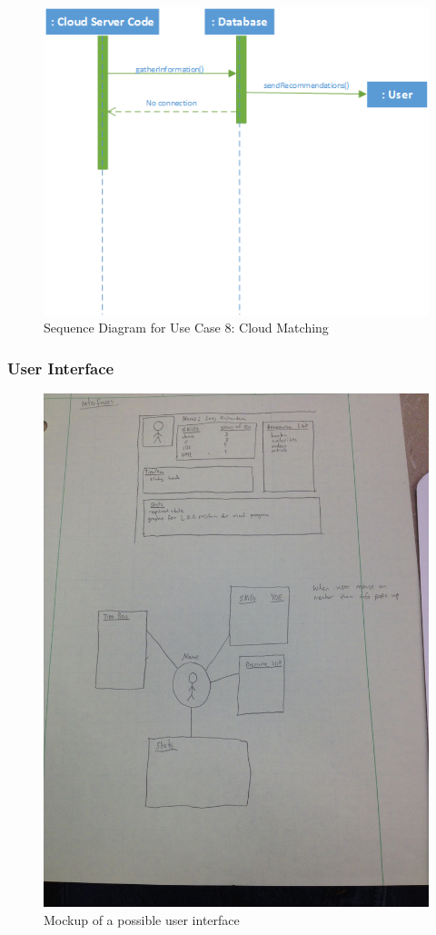 \documentclass[11pt]{article}
\begin{document}
            \begin{figure}[H]
            \centering
            \includegraphics{SequenceUseCase8CloudMatching}
            \caption{Sequence Diagram for Use Case 8: Cloud Matching}
            \label{SUC8}
            \end{figure}

        \subsubsection{User Interface}
			\begin{figure}[H]
				\centering
				\includegraphics[angle=-90,width=12 cm]{PossibleUserInterface}
				\caption{Mockup of a possible user interface}
				\label{UIMockup}
			\end{figure}
\end{document}
